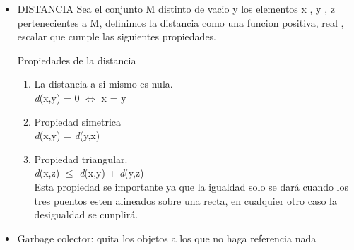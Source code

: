 \documentclass[a4paper,16pt]{article}
\begin{document}
\begin{itemize}
    \item DISTANCIA
Sea el conjunto M distinto de vacio y  los elementos  x , y , z  pertenecientes a M, definimos la distancia como una funcion positiva, real , escalar que cumple las siguientes propiedades.

Propiedades de la distancia
\begin{enumerate}
\item La distancia a si mismo es nula.
\\ \textit d({x,y}) = 0 $\Longleftrightarrow$  x = y

\item Propiedad simetrica
\\ \textit d({x,y}) = \textit d({y,x})


\item Propiedad triangular.
\\ \textit d({x,z}) $\leq$ \textit d({x,y}) + \textit d({y,z}) \\Esta propiedad se importante ya que la igualdad solo se dar\'a cuando los tres puentos esten alineados sobre una recta, en cualquier otro caso la desigualdad se cunplir\'a.

\end{enumerate}



    \item Garbage colector: quita los objetos a los que no haga referencia nada
\end{itemize}
\end{document}

